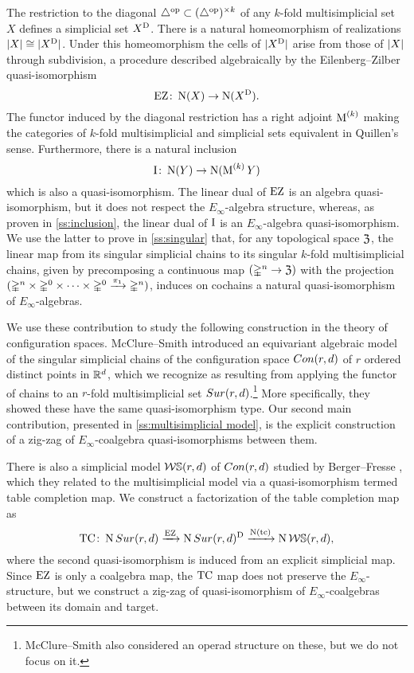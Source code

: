 The restriction to the diagonal $\triangle^{\mathrm{op}} \subset (\triangle^{\mathrm{op}})^{\times k}$ of any $k$-fold multisimplicial set $X$ defines a simplicial set $X^{\mathrm{D}}$.
There is a natural homeomorphism of realizations $\lvert X\rvert \cong \lvert X^{\mathrm{D}}\rvert$.
Under this homeomorphism the cells of $\lvert X^{\mathrm{D}}\rvert$ arise from those of $\lvert X\rvert$ through subdivision, a procedure described algebraically by the Eilenberg--Zilber quasi-isomorphism
\[
\operatorname{EZ} \colon \operatorname{N}(X) \to \operatorname{N}(X^{\mathrm{D}}).
\]
The functor induced by the diagonal restriction has a right adjoint $\operatorname{M}^{(k)}$ making the categories of $k$-fold multisimplicial and simplicial sets equivalent in Quillen's sense.
Furthermore, there is a natural inclusion
\[
\operatorname{I} \colon \operatorname{N}(Y) \to \operatorname{N}(\operatorname{M}^{(k)} Y)
\]
which is also a quasi-isomorphism.
The linear dual of $\operatorname{EZ}$ is an algebra quasi-isomorphism, but it does not respect the $E_\infty$-algebra structure, whereas, as proven in \cref{ss:inclusion}, the linear dual of $\operatorname{I}$ is an $E_\infty$-algebra quasi-isomorphism.
We use the latter to prove in \cref{ss:singular} that, for any topological space $\mathfrak{Z}$, the linear map from its singular simplicial chains to its singular $k$-fold multisimplicial chains, given by precomposing a continuous map $(\mathbb{\Delta}^n \to \mathfrak{Z})$ with the projection $(\mathbb{\Delta}^n \times \mathbb{\Delta}^{0}\times\dots\times\mathbb{\Delta}^{0} \xrightarrow{\pi_1} \mathbb{\Delta}^n)$, induces on cochains a natural quasi-isomorphism of $E_\infty$-algebras.

We use these contribution to study the following construction in the theory of configuration spaces.
McClure--Smith \cite{mcclure2003multivariable} introduced an equivariant algebraic model of the singular simplicial chains of the configuration space $Con(r,d)$ of $r$ ordered distinct points in $\mathbb{R}^d$, which we recognize as resulting from applying the functor of chains to an $r$-fold multisimplicial set $Sur(r,d)$.\footnote{McClure--Smith also considered an operad structure on these, but we do not focus on it.}
More specifically, they showed these have the same quasi-isomorphism type.
Our second main contribution, presented in \cref{ss:multisimplicial model}, is the explicit construction of a zig-zag of $E_\infty$-coalgebra quasi-isomorphisms between them.

There is also a simplicial model $\mathcal{W}\mathbb{S}(r,d)$ of $Con(r,d)$ studied by Berger--Fresse \cite{berger2004combinatorial}, which they related to the multisimplicial model via a quasi-isomorphism termed table completion map.
We construct a factorization of the table completion map as
\[
\operatorname{TC} \colon
\operatorname{N}Sur(r,d)
\xrightarrow{\operatorname{EZ}}
\operatorname{N}Sur(r,d)^{\mathrm{D}}
\xrightarrow{\operatorname{N}(\mathrm{tc})}
\operatorname{N} \mathcal{W}\mathbb{S}(r,d),
\]
where the second quasi-isomorphism is induced from an explicit simplicial map.
Since $\operatorname{EZ}$ is only a coalgebra map, the $\operatorname{TC}$ map does not preserve the $E_\infty$-structure, but we construct a zig-zag of quasi-isomorphism of $E_\infty$-coalgebras between its domain and target.